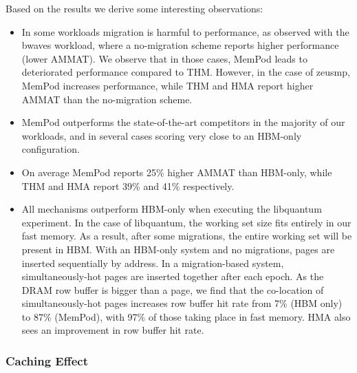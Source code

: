 Based on the results we derive some interesting observations:
\begin{itemize}[leftmargin=0.4cm]
\setlength\itemsep{0em}
	\item {} In some workloads migration is harmful to performance, as observed with the bwaves workload, where a no-migration scheme reports higher performance (lower AMMAT). We observe that in those cases, MemPod leads to deteriorated performance compared to THM. However, in the case of zeusmp, MemPod increases performance, while THM and HMA report higher AMMAT than the no-migration scheme.
	\item MemPod outperforms the state-of-the-art competitors in the majority of our workloads, and in several cases scoring very close to an HBM-only configuration. 
	\item On average MemPod reports 25\% higher AMMAT than HBM-only, while THM and HMA report 39\% and 41\% respectively.
	\item All mechanisms outperform HBM-only when executing the libquantum experiment. In the case of libquantum, the working set size fits entirely in our fast memory. As a result, after some migrations, the entire working set will be present in HBM.  With an HBM-only system and no migrations, pages
are inserted sequentially by address.  In a migration-based system, 
simultaneously-hot pages are inserted together after each epoch.  As the
DRAM row buffer is bigger than a page, we find that the co-location of
simultaneously-hot pages increases row buffer hit rate from 7\% (HBM only)
to 87\% (MemPod), with 97\% of those taking place in fast memory.  HMA also sees an improvement in row buffer hit rate.
\end{itemize}

\subsubsection{Caching Effect}

